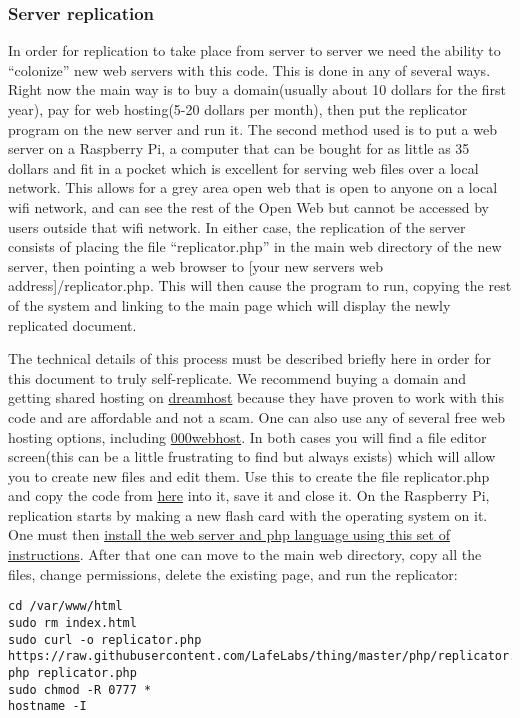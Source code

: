 \documentclass[12pt,a4paper]{amsart}
\numberwithin{equation}{section}
\begin{document}
\subsubsection{Server replication}\label{server-replication}

In order for replication to take place from server to server we need the
ability to ``colonize'' new web servers with this code. This is done in
any of several ways. Right now the main way is to buy a domain(usually
about 10 dollars for the first year), pay for web hosting(5-20 dollars
per month), then put the replicator program on the new server and run
it. The second method used is to put a web server on a Raspberry Pi, a
computer that can be bought for as little as 35 dollars and fit in a
pocket which is excellent for serving web files over a local network.
This allows for a grey area open web that is open to anyone on a local
wifi network, and can see the rest of the Open Web but cannot be
accessed by users outside that wifi network. In either case, the
replication of the server consists of placing the file
``replicator.php'' in the main web directory of the new server, then
pointing a web browser to {[}your new servers web
address{]}/replicator.php. This will then cause the program to run,
copying the rest of the system and linking to the main page which will
display the newly replicated document.

The technical details of this process must be described briefly here in
order for this document to truly self-replicate. We recommend buying a
domain and getting shared hosting on
\href{https://www.dreamhost.com/}{dreamhost} because they have proven to
work with this code and are affordable and not a scam. One can also use
any of several free web hosting options, including
\href{https://www.000webhost.com/}{000webhost}. In both cases you will
find a file editor screen(this can be a little frustrating to find but
always exists) which will allow you to create new files and edit them.
Use this to create the file replicator.php and copy the code from
\href{php/replicator.txt}{here} into it, save it and close it. On the
Raspberry Pi, replication starts by making a new flash card with the
operating system on it. One must then
\href{https://www.raspberrypi.org/documentation/remote-access/web-server/apache.md}{install
the web server and php language using this set of instructions}. After
that one can move to the main web directory, copy all the files, change
permissions, delete the existing page, and run the replicator:

\begin{verbatim}
cd /var/www/html
sudo rm index.html
sudo curl -o replicator.php https://raw.githubusercontent.com/LafeLabs/thing/master/php/replicator.txt
php replicator.php
sudo chmod -R 0777 *
hostname -I
\end{verbatim}
\end{document}
